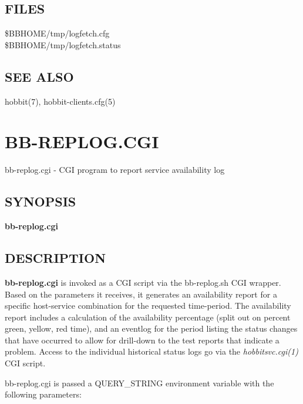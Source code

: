 \subsection{FILES}
\begin{description}
\item[\$BBHOME/tmp/logfetch.cfg]
\item[\$BBHOME/tmp/logfetch.status]

 


\end{description}
\subsection{SEE ALSO}
hobbit(7), hobbit-clients.cfg(5) 

  
%
%



\newpage
\section{BB-REPLOG.CGI}

 bb-replog.cgi - CGI program to report service availability log 

\subsection{SYNOPSIS}
\textbf{bb-replog.cgi}


 
\subsection{DESCRIPTION}
\textbf{bb-replog.cgi}
 is invoked as a CGI script via the bb-replog.sh CGI wrapper. Based on
 the parameters it receives, it generates an availability report for a
 specific host-service combination for the requested time-period. The
 availability report includes a calculation of the availability
 percentage (split out on percent green, yellow, red time), and an
 eventlog for the period listing the status changes that have occurred
 to allow for drill-down to the test reports that indicate a
 problem. Access to the individual historical status logs go via the
 \emph{hobbitsvc.cgi(1)} CGI script. 


  bb-replog.cgi is passed a QUERY\_STRING environment variable with the following parameters: 


